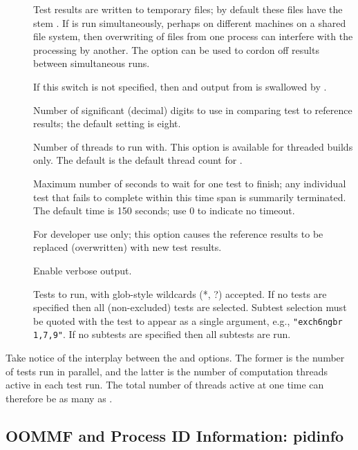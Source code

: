 \begin{description}
\item[]
  Test results are written to temporary files; by default these files
  have the stem .  If 
  is run simultaneously, perhaps on different machines on a shared
  file system, then overwriting of files from one process can
  interfere with the processing by another.  The 
  option can be used to cordon off results between simultaneous runs.
\item[]
  If this switch is not specified, then  and 
  output from  is swallowed by .
\item[]
 Number of significant (decimal) digits to use in comparing test to
 reference results; the default setting is eight.
\item[]
 Number of threads to run  with.  This option is available
 for threaded builds only.  The default is the default thread count
 for .
\item[]
 Maximum number of seconds to wait for one test to finish; any
 individual test that fails to complete within this time span is summarily
 terminated.  The default time is 150 seconds; use 0 to indicate no timeout.
\item[]
 For developer use only; this option causes the reference results to
 be replaced (overwritten) with new test results.
\item[]
 Enable verbose output.
\item[]
 Tests to run, with glob-style wildcards (*, ?) accepted.  If no tests
 are specified then all (non-excluded) tests are selected.  Subtest
 selection must be quoted with the test to appear as a single
 argument, e.g., \verb+"exch6ngbr 1,7,9"+.  If no subtests are
 specified then all subtests are run.
\end{description}
Take notice  of the interplay between the  and
 options. The former is the number of tests run in
parallel, and the latter is the number of computation threads active in
each test run. The total number of threads active at one time can
therefore be as many as .


\subsection{OOMMF and Process ID Information: pidinfo\label{sec:pidinfo}}%

